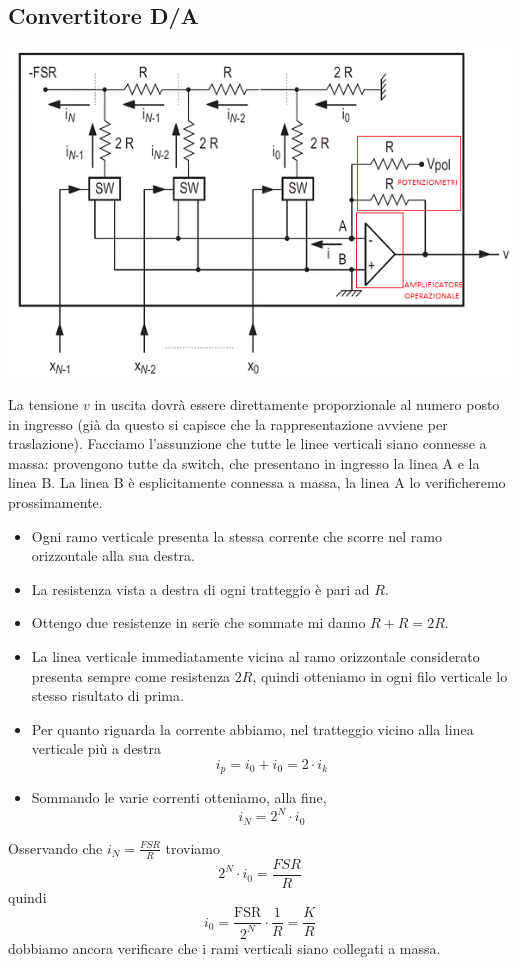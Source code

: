 \documentclass[11pt]{report}
\begin{document}
\subsection{Convertitore D/A}
\begin{center}
\includegraphics{img/233.PNG}
\end{center}
La tensione $v$ in uscita dovrà essere direttamente proporzionale al numero posto in ingresso (già da questo si capisce che la rappresentazione avviene per traslazione). Facciamo l'assunzione che tutte le linee verticali siano connesse a massa: provengono tutte da switch, che presentano in ingresso la linea A e la linea B. La linea B è esplicitamente connessa a massa, la linea A lo verificheremo prossimamente. 
\begin{itemize}
\item Ogni ramo verticale presenta la stessa corrente che scorre nel ramo orizzontale alla sua destra.
\item La resistenza vista a destra di ogni tratteggio è pari ad $R$. 
\item Ottengo due resistenze in serie che sommate mi danno $R+R=2R$.
\item La linea verticale immediatamente vicina al ramo orizzontale considerato presenta sempre come resistenza $2R$, quindi otteniamo in ogni filo verticale lo stesso risultato di prima.
\item Per quanto riguarda la corrente abbiamo, nel tratteggio vicino alla linea verticale più a destra
\[i_p=i_0+i_0=2\cdot i_k\]
\item Sommando le varie correnti otteniamo, alla fine,
\[\boxed{i_N=2^N \cdot i_0}\]
\end{itemize}
Osservando che $i_N=\frac{FSR}{R}$ troviamo
\[2^N \cdot i_0 = \frac{FSR}{R}\]
quindi
\[i_0=\frac{\text{FSR}}{2^N} \cdot \frac{1}{R}=\frac{K}{R}\]
dobbiamo ancora verificare che i rami verticali siano collegati a massa.
\end{document}
